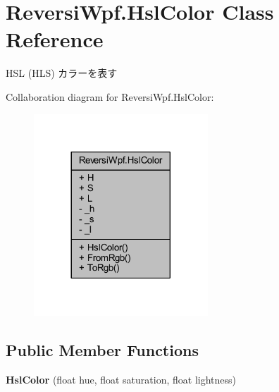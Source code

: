 \hypertarget{class_reversi_wpf_1_1_hsl_color}{}\section{Reversi\+Wpf.\+Hsl\+Color Class Reference}
\label{class_reversi_wpf_1_1_hsl_color}


H\+SL (H\+LS) カラーを表す  




Collaboration diagram for Reversi\+Wpf.\+Hsl\+Color\+:\nopagebreak
\begin{figure}[H]
\begin{center}
\leavevmode
\includegraphics[width=185pt]{class_reversi_wpf_1_1_hsl_color__coll__graph}
\end{center}
\end{figure}
\subsection*{Public Member Functions}
\begin{DoxyCompactItemize}
\item 
\mbox{\label{class_reversi_wpf_1_1_hsl_color_a55ebdc383bf75f88cc61e6312f8899ba}} 
{\bfseries Hsl\+Color} (float hue, float saturation, float lightness)
\end{DoxyCompactItemize}

